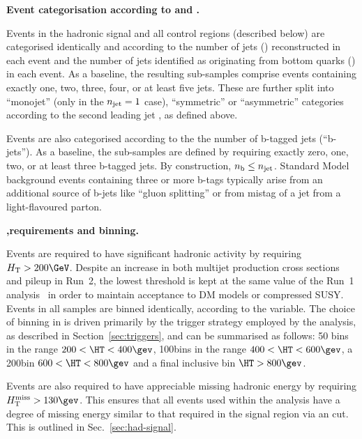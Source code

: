 {\bf Event categorisation according to \njet and \nb.} 

Events in the hadronic signal and all control regions (described
below) are categorised identically and according to the number of jets
(\njet) reconstructed in each event and the number of jets identified
as originating from bottom quarks (\nb) in each event. As a baseline,
the resulting sub-samples comprise events containing exactly one, two,
three, four, or at least five jets. These are further split into
``monojet'' (only in the $n_{\text{jet}}=1$ case),
``symmetric'' or ``asymmetric'' \njet categories according to the
second leading jet \Pt, as defined above.

Events are also categorised according to the the number of b-tagged
jets (``b-jets''). As a baseline, the sub-samples are defined by
requiring exactly zero, one, two, or at least three b-tagged jets. By
construction, $n_{\text{b}} \leq n_{\text{jet}}$. Standard Model background events containing three or more b-tags
typically arise from an additional source of b-jets like 
``gluon splitting'' or from 
mistag of a jet from a light-flavoured parton. 


{\bf \HT,\mht requirements and binning.} 

Events are required to have significant hadronic activity by requiring
$\scalht > 200\GeV$. Despite an increase in both multijet production
cross sections and pileup in Run~2, the lowest \HT threshold is
kept at the same value of the Run~1 analysis~\cite{Chatrchyan:2013lya}
in order to maintain acceptance to DM models or compressed
SUSY. Events in all samples are binned identically, according to the
\HT variable. The choice of binning in \HT is driven primarily by the
trigger strategy employed by the analysis, as described in
Section~\ref{sec:triggers}, and can be summarised as follows: 50\gev
bins in the range $200 < \HT < 400\gev$, 100\gev bins in the range
$400 < \HT < 600\gev$, a 200\gev bin $600<\HT<800\gev$ and a final 
inclusive bin $\HT > 800\gev$.

Events are also required to have appreciable missing hadronic energy
by requiring $\mht>130\gev$. This ensures that all events used within
the analysis have a degree of missing energy similar to that required
in the signal region via an \alphat cut. This is outlined in
Sec.~\ref{sec:had-signal}. 

